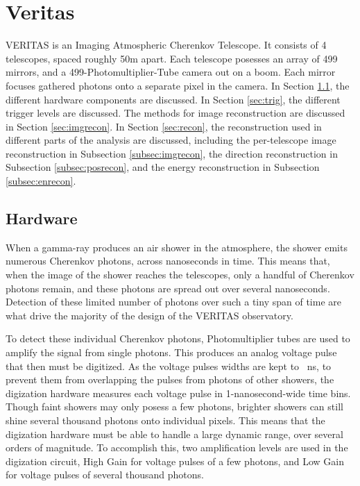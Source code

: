 \cleartooddpage[\thispagestyle{empty}]
\chapter{Veritas}

VERITAS is an Imaging Atmospheric Cherenkov Telescope.
It consists of 4 telescopes, spaced roughly 50m apart.
Each telescope posesses an array of 499 mirrors, and a 499-Photomultiplier-Tube camera out on a boom.
Each mirror focuses gathered photons onto a separate pixel in the camera.
In Section \ref{sec:hardware}, the different hardware components are discussed.
In Section \ref{sec:trig}, the different trigger levels are discussed.
The methods for image reconstruction are discussed in Section \ref{sec:imgrecon}.
In Section \ref{sec:recon}, the reconstruction used in different parts of the analysis are discussed, including the per-telescope image reconstruction in Subsection \ref{subsec:imgrecon}, the direction reconstruction in Subsection \ref{subsec:posrecon}, and the energy reconstruction in Subsection \ref{subsec:enrecon}.


\section{Hardware}\label{sec:hardware}
When a gamma-ray produces an air shower in the atmosphere, the shower emits numerous Cherenkov photons, across nanoseconds in time.
This means that, when the image of the shower reaches the telescopes, only a handful of Cherenkov photons remain, and these photons are spread out over several nanoseconds.
Detection of these limited number of photons over such a tiny span of time are what drive the majority of the design of the VERITAS observatory.

To detect these individual Cherenkov photons, Photomultiplier tubes are used to amplify the signal from single photons.
This produces an analog voltage pulse that then must be digitized.
As the voltage pulses widths are kept to ~ns, to prevent them from overlapping the pulses from photons of other showers, the digization hardware measures each voltage pulse in 1-nanosecond-wide time bins.
Though faint showers may only posess a few photons, brighter showers can still shine several thousand photons onto individual pixels.
This means that the digization hardware must be able to handle a large dynamic range, over several orders of magnitude.
To accomplish this, two amplification levels are used in the digization circuit, High Gain for voltage pulses of a few photons, and Low Gain for voltage pulses of several thousand photons.


